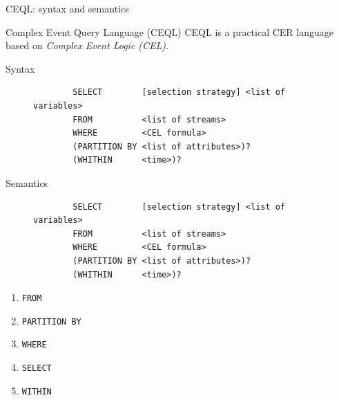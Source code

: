 \documentclass[xcolor=pdftex,dvipsnames,table]{beamer}
\newcommand{\code}[1]{\texttt{#1}}
\begin{document}
\begin{frame}{CEQL: syntax and semantics}
  \begin{block}{Complex Event Query Language (CEQL)}
    CEQL is a practical CER language based on \emph{Complex Event Logic (CEL)}.
  \end{block}
  \begin{block}{Syntax}
    \begin{figure}[H]
      \begin{verbatim}
        SELECT        [selection strategy] <list of variables>
        FROM          <list of streams>
        WHERE         <CEL formula>
        (PARTITION BY <list of attributes>)?
        (WHITHIN      <time>)?
      \end{verbatim}
    \end{figure}
  \end{block}
  \begin{block}{Semantics}
    \begin{figure}[H]
      \begin{verbatim}
        SELECT        [selection strategy] <list of variables>
        FROM          <list of streams>
        WHERE         <CEL formula>
        (PARTITION BY <list of attributes>)?
        (WHITHIN      <time>)?
      \end{verbatim}
    \end{figure}
    \begin{enumerate}
      \item \code{FROM}
      \item \code{PARTITION BY}
      \item \code{WHERE}
      \item \code{SELECT}
      \item \code{WITHIN}
    \end{enumerate}
  \end{block}
\end{frame}

\end{document}
